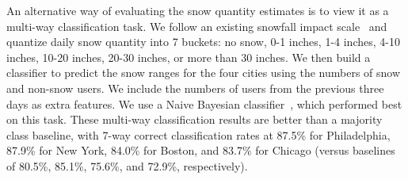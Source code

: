 
An alternative way of evaluating the snow quantity estimates is to view
it as a multi-way classification task. 
We follow an existing snowfall impact scale~\cite{squires5} and
quantize daily snow quantity into 7 buckets: no snow, 0-1 inches, 1-4
inches, 4-10 inches, 10-20 inches, 20-30 inches, or more than 30
inches.  We then build a classifier to predict the snow
ranges for the four cities using the numbers of snow and non-snow users. We include
the numbers of users from the previous three days as extra
features. We use a Naive Bayesian classifier~\cite{john1995estimating}, which performed best on this task.
These multi-way classification results are  better than a majority class baseline, with 7-way correct classification rates
at 87.5\% for Philadelphia, 87.9\% for New York, 84.0\% for Boston, and 83.7\% for Chicago (versus baselines of 80.5\%, 85.1\%, 75.6\%, and 72.9\%, respectively).






